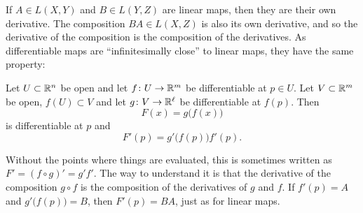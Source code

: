 If $A \in L(X,Y)$ and $B \in L(Y,Z)$ are linear maps, then 
they are their own derivative.  The composition
$BA \in L(X,Z)$ is also its own derivative, and
so the derivative of the composition is the composition
of the derivatives.  As differentiable maps are ``infinitesimally close''
to linear maps, they have the same property:

\begin{thm}
Let $U \subset {\mathbb{R}}^n$ be open and let $f \colon U \to {\mathbb{R}}^m$ be
differentiable at $p \in U$.  Let $V \subset {\mathbb{R}}^m$ be open,
$f(U) \subset V$ and let $g \colon V \to {\mathbb{R}}^\ell$ be differentiable
at $f(p)$.  Then
\begin{equation*}
F(x) = g\bigl(f(x)\bigr)
\end{equation*}
is differentiable at $p$ and
\begin{equation*}
F'(p) = g'\bigl(f(p)\bigr) f'(p) .
\end{equation*}
\end{thm}

Without the points where things are evaluated, this is sometimes written as
$F' = {(f \circ g)}' = g' f'$.  The way to
understand it is that the derivative of the composition $g \circ f$
is the composition of the derivatives of $g$ and $f$.  If
$f'(p) = A$ and $g'\bigl(f(p)\bigr) = B$, then $F'(p) = BA$,
just as for linear maps.

